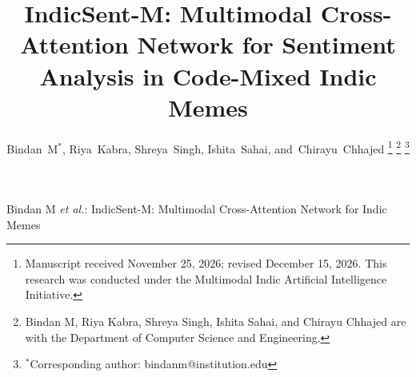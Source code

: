 \documentclass[10pt,journal,compsoc]{IEEEtran}
\begin{document}
\title{IndicSent-M: Multimodal Cross-Attention Network for Sentiment Analysis in Code-Mixed Indic Memes}

\author{Bindan~M$^{*}$, 
        Riya~Kabra, 
        Shreya~Singh, 
        Ishita~Sahai, 
        and~Chirayu~Chhajed
\thanks{Manuscript received November 25, 2026; revised December 15, 2026. This research was conducted under the Multimodal Indic Artificial Intelligence Initiative.}
\thanks{Bindan M, Riya Kabra, Shreya Singh, Ishita Sahai, and Chirayu Chhajed are with the Department of Computer Science and Engineering.}
\thanks{$^{*}$Corresponding author: bindanm@institution.edu}
}

%
{Bindan M \MakeLowercase{\textit{et al.}}: IndicSent-M: Multimodal Cross-Attention Network for Indic Memes}
\end{document}
